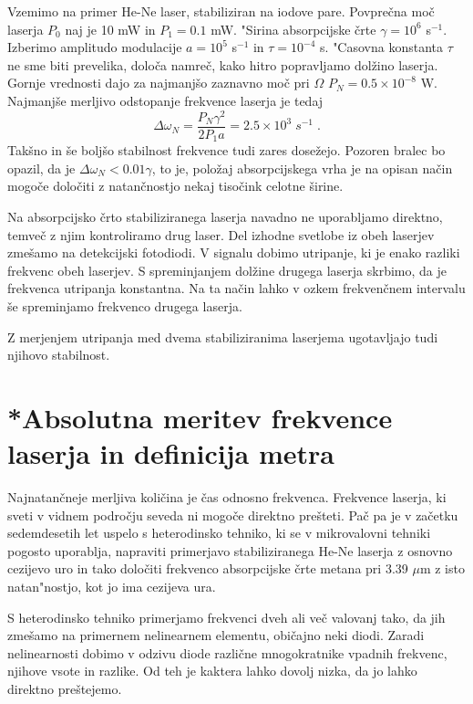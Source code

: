 Vzemimo na primer He-Ne laser, stabiliziran na iodove pare. Povprečna moč
laserja $P_0$ naj je 10 mW in $P_1=0.1 $ mW. "Sirina absorpcijske črte $%
\gamma= 10^6$ s$^{-1}$. Izberimo amplitudo modulacije $a=10^5$ s$^{-1}$ in $%
\tau=10^{-4}$ s. "Casovna konstanta $\tau$ ne sme biti prevelika, določa
namreč, kako hitro popravljamo dolžino laserja. Gornje vrednosti dajo
za najmanjšo zaznavno moč pri $\Omega$ $P_N=0.5\times10^{-8}$ W.
Najmanjše merljivo odstopanje frekvence laserja je tedaj 
\begin{equation}  \label{5.44}
\Delta\omega_N=\frac{P_N \gamma^2}{2P_1 a}=2.5\times 10^3\;s^{-1}\;.
\end{equation}
Takšno in še boljšo stabilnost frekvence tudi zares dosežejo. Pozoren
bralec bo opazil, da je $\Delta\omega_N<0.01 \gamma$, to je, položaj
absorpcijskega vrha je na opisan način mogoče določiti z natančnostjo
nekaj tisočink celotne širine.

Na absorpcijsko črto stabiliziranega laserja navadno ne uporabljamo
direktno, temveč z njim kontroliramo drug laser. Del izhodne svetlobe iz
obeh laserjev zmešamo na detekcijski fotodiodi. V signalu dobimo utripanje,
ki je enako razliki frekvenc obeh laserjev. S spreminjanjem dolžine drugega
laserja skrbimo, da je frekvenca utripanja konstantna. Na ta način lahko v
ozkem frekvenčnem intervalu še spreminjamo frekvenco drugega laserja.

Z merjenjem utripanja med dvema stabiliziranima laserjema ugotavljajo tudi
njihovo stabilnost.

\section{*Absolutna meritev frekvence laserja in definicija metra}

Najnatančneje merljiva količina je čas odnosno frekvenca. Frekvence
laserja, ki sveti v vidnem področju seveda ni mogoče direktno prešteti.
Pač pa je v začetku sedemdesetih let uspelo s heterodinsko tehniko, ki se
v mikrovalovni tehniki pogosto uporablja, napraviti primerjavo
stabiliziranega He-Ne laserja z osnovno cezijevo uro in tako določiti
frekvenco absorpcijske črte metana pri 3.39 $\mu$m z isto natan"nostjo, kot
jo ima cezijeva ura.

S heterodinsko tehniko primerjamo frekvenci dveh ali več valovanj tako, da
jih zmešamo na primernem nelinearnem elementu, običajno neki diodi. Zaradi
nelinearnosti dobimo v odzivu diode različne mnogokratnike vpadnih
frekvenc, njihove vsote in razlike. Od teh je kaktera lahko dovolj nizka, da
jo lahko direktno preštejemo.


